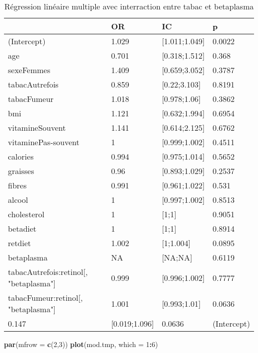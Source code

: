 \documentclass[]{article}
\newenvironment{Shaded}{\begin{snugshade}}{\end{snugshade}}
\newcommand{\KeywordTok}[1]{\textcolor[rgb]{0.13,0.29,0.53}{\textbf{#1}}}
\newcommand{\DataTypeTok}[1]{\textcolor[rgb]{0.13,0.29,0.53}{#1}}
\newcommand{\DecValTok}[1]{\textcolor[rgb]{0.00,0.00,0.81}{#1}}
\newcommand{\OperatorTok}[1]{\textcolor[rgb]{0.81,0.36,0.00}{\textbf{#1}}}
\newcommand{\NormalTok}[1]{#1}
\begin{document}
\begin{table}

\caption{\label{tab:unnamed-chunk-85}Régression linéaire multiple avec interraction entre tabac et betaplasma}
\centering
\begin{tabular}[t]{l|l|l|l}
\hline
  & OR & IC & p\\
\hline
\rowcolor[HTML]{BBD2E1}  (Intercept) & 1.029 & [1.011;1.049] & 0.0022\\
\hline
age & 0.701 & [0.318;1.512] & 0.368\\
\hline
\rowcolor[HTML]{BBD2E1}  sexeFemmes & 1.409 & [0.659;3.052] & 0.3787\\
\hline
tabacAutrefois & 0.859 & [0.22;3.103] & 0.8191\\
\hline
\rowcolor[HTML]{BBD2E1}  tabacFumeur & 1.018 & [0.978;1.06] & 0.3862\\
\hline
bmi & 1.121 & [0.632;1.994] & 0.6954\\
\hline
\rowcolor[HTML]{BBD2E1}  vitamineSouvent & 1.141 & [0.614;2.125] & 0.6762\\
\hline
vitaminePas-souvent & 1 & [0.999;1.002] & 0.4511\\
\hline
\rowcolor[HTML]{BBD2E1}  calories & 0.994 & [0.975;1.014] & 0.5652\\
\hline
graisses & 0.96 & [0.893;1.029] & 0.2537\\
\hline
\rowcolor[HTML]{BBD2E1}  fibres & 0.991 & [0.961;1.022] & 0.531\\
\hline
alcool & 1 & [0.997;1.002] & 0.8513\\
\hline
\rowcolor[HTML]{BBD2E1}  cholesterol & 1 & [1;1] & 0.9051\\
\hline
betadiet & 1 & [1;1] & 0.8914\\
\hline
\rowcolor[HTML]{BBD2E1}  retdiet & 1.002 & [1;1.004] & 0.0895\\
\hline
betaplasma & NA & [NA;NA] & 0.6119\\
\hline
\rowcolor[HTML]{BBD2E1}  tabacAutrefois:retinol[, "betaplasma"] & 0.999 & [0.996;1.002] & 0.7777\\
\hline
tabacFumeur:retinol[, "betaplasma"] & 1.001 & [0.993;1.01] & 0.0636\\
\hline
\rowcolor[HTML]{BBD2E1}  0.147 & [0.019;1.096] & 0.0636 & (Intercept)\\
\hline
\end{tabular}
\end{table}

\begin{Shaded}
\begin{Highlighting}[]
\KeywordTok{par}\NormalTok{(}\DataTypeTok{mfrow =} \KeywordTok{c}\NormalTok{(}\DecValTok{2}\NormalTok{,}\DecValTok{3}\NormalTok{))}
\KeywordTok{plot}\NormalTok{(mod.tmp, }\DataTypeTok{which =} \DecValTok{1}\OperatorTok{:}\DecValTok{6}\NormalTok{)}
\end{Highlighting}
\end{Shaded}
\end{document}
